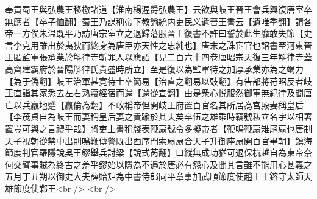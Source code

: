 奉貢蜀王與弘農王移檄諸道【淮南楊渥爵弘農王】云欲與岐王晉王會兵興復唐室卒無應者【卒子恤翻】蜀王乃謀稱帝下教諭統内吏民义遺晉王書云【遺唯季翻】請各帝一方俟朱温既平乃訪唐宗室立之退歸藩服晉王復書不許曰誓於此生靡敢失節【史言李克用雖出於夷狄而終身為唐臣亦天性之忠純也】唐末之誅宦官也詔書至河東晉王匿監軍張承業於斛律寺斬罪人以應詔【見二百六十四卷唐昭宗天復三年斛律寺蓋高齊建霸府於晉陽斛律氏貴盛時所立】至是復以為監軍待之加厚承業亦為之竭力【為于偽翻】岐王治軍甚寛待士卒簡易【治直之翻易以䜴翻】有告部將苻昭反者岐王直詣其家悉去左右熟寢經宿而還【還從宣翻】由是衆心悦服然御軍無紀律及聞唐亡以兵羸地蹙【贏倫為翻】不敢稱帝但開岐王府置百官名其所居為宫殿妻稱皇后【李茂貞自為岐王而妻稱皇后妻之貴踰於其夫矣卒伍之雄乘時竊號私立名字以相署置豈可與之言禮乎哉】將吏上書稱牋表鞭扇號令多擬帝者【鞭鳴鞭扇雉尾扇也唐制天子視朝從禁中出則鳴鞭傳警既出西序門索扇扇合天子升御座扇開百官畢朝】鎮海節度判官羅隱說吳王鏐舉兵討梁【說式芮翻】曰縱無成功猶可退保杭越自為東帝奈何交臂事賊為終古之羞乎鏐始以隱為不遇於唐必有怨心及聞其言雖不能用心甚義之　五月丁丑朔以御史大夫薛貽矩為中書侍郎同平章事加武順節度使趙王王鎔守太師天雄節度使鄴王<br />
<br />

